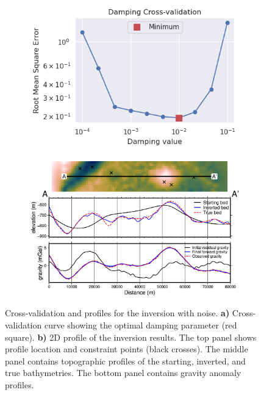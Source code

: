 \begin{figure}[!ht]
  \centering
    \begin{subfigure}[t]{.40\textwidth}
        \centering
        \includegraphics[width=\textwidth]{figures/chp3/chp3_simple_noise_CV.png}
        \caption{}
    \end{subfigure}
    \begin{subfigure}[t]{.58\textwidth}
        \centering
        \includegraphics[width=\textwidth]{figures/chp3/chp3_simple_noise_profile.png}
        \caption{}
    \end{subfigure}
  \caption[Synthetic inversion with noise, CV and profile]{Cross-validation and profiles for the inversion with noise. \textbf{a)} Cross-validation curve showing the optimal damping parameter (red square). \textbf{b)} 2D profile of the inversion results. The top panel shows profile location and constraint points (black crosses). The middle panel contains topographic profiles of the starting, inverted, and true bathymetries. The bottom panel contains gravity anomaly profiles.}
    \label{fig:chp3_simple_noise_CV_and_profile}
\end{figure}

